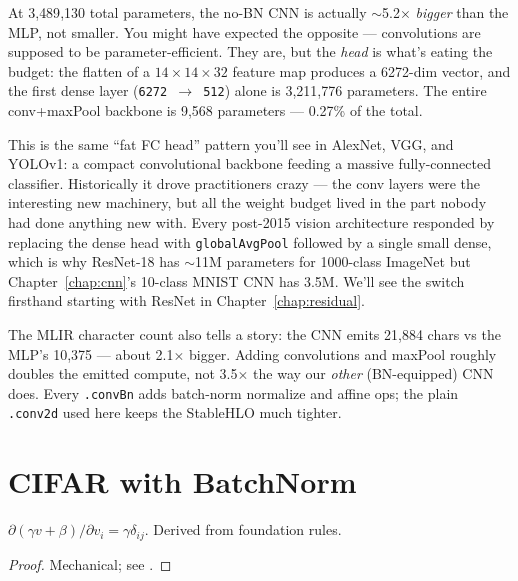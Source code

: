 At 3{,}489{,}130 total parameters, the no-BN CNN is actually
$\sim$5.2$\times$ \emph{bigger} than the MLP, not smaller. You
might have expected the opposite --- convolutions are supposed to
be parameter-efficient. They are, but the \emph{head} is what's
eating the budget: the flatten of a $14 \times 14 \times 32$ feature
map produces a 6272-dim vector, and the first dense layer
(\texttt{6272 $\to$ 512}) alone is 3{,}211{,}776 parameters. The
entire conv+maxPool backbone is 9{,}568 parameters --- 0.27\% of
the total.

This is the same ``fat FC head'' pattern you'll see in AlexNet, VGG,
and YOLOv1: a compact convolutional backbone feeding a massive
fully-connected classifier. Historically it drove practitioners
crazy --- the conv layers were the interesting new machinery, but
all the weight budget lived in the part nobody had done anything
new with. Every post-2015 vision architecture responded by
replacing the dense head with \texttt{globalAvgPool} followed by a
single small dense, which is why ResNet-18 has $\sim$11M parameters
for 1000-class ImageNet but Chapter~\ref{chap:cnn}'s 10-class MNIST
CNN has 3.5M. We'll see the switch firsthand starting with ResNet
in Chapter~\ref{chap:residual}.

The MLIR character count also tells a story: the CNN emits 21{,}884
chars vs the MLP's 10{,}375 --- about 2.1$\times$ bigger. Adding
convolutions and maxPool roughly doubles the emitted compute, not
3.5$\times$ the way our \emph{other} (BN-equipped) CNN does. Every
\texttt{.convBn} adds batch-norm normalize and affine ops; the
plain \texttt{.conv2d} used here keeps the StableHLO much tighter.

\chapter{CIFAR with BatchNorm}
\label{chap:bn}

\begin{theorem}
  \label{ax:pdiv_bnAffine}
  \leanok
  \(\partial (\gamma v + \beta) / \partial v_i = \gamma \delta_{ij}\).
  Derived from foundation rules.
\end{theorem}

\begin{proof}
\leanok
Mechanical; see .
\end{proof}

